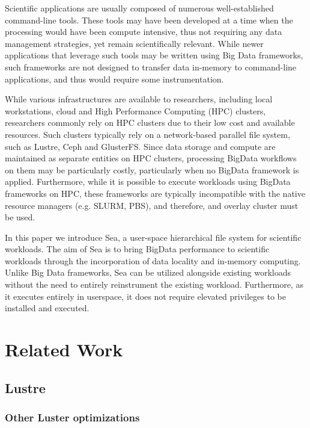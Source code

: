 \documentclass[10pt,journal,compsoc]{IEEEtran}
\begin{document}
Scientific applications are usually composed of numerous well-established command-line tools. These tools
may have been developed at a time when the processing would have been compute intensive, thus not requiring any
data management strategies, yet remain scientifically relevant. While newer applications
that leverage such tools may be written using Big Data frameworks, such frameworks are not designed to transfer
data in-memory to command-line applications, and thus would require some instrumentation.

While various infrastructures are available to researchers, including local workstations, cloud and 
High Performance Computing (HPC) clusters, researchers commonly rely on HPC clusters due to their low cost and available
resources. Such clusters typically rely on a network-based parallel file system, such as Lustre, Ceph and GlusterFS.
Since data storage and compute are maintained as separate entities on HPC clusters, processing BigData workflows on them
may be particularly costly, particularly when no BigData framework is applied. Furthermore, while it is possible to execute
workloads using BigData frameworks on HPC, these frameworks are typically incompatible with the native resource managers (e.g. SLURM, PBS),
and therefore, and overlay cluster must be used.

In this paper we introduce Sea, a user-space hierarchical file system for scientific workloads. The aim of Sea
is to bring BigData performance to scientific workloads through the incorporation of data locality and
in-memory computing. Unlike Big Data frameworks, Sea can be utilized alongside existing workloads without
the need to entirely reinstrument the existing workload. Furthermore, as it executes entirely in userspace,
it does not require elevated privileges to be installed and executed.






\section{Related Work}
\subsection{Lustre}
\subsubsection{Other Luster optimizations}
\end{document}
